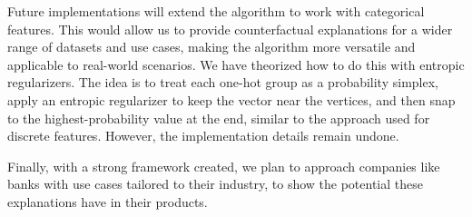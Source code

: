 \documentclass[12pt]{extarticle}
\numberwithin{equation}{section}
\begin{document}
Future implementations will extend the algorithm to work with categorical features. This would allow us to provide counterfactual explanations for a wider range of datasets and use cases, making the algorithm more versatile and applicable to real-world scenarios. We have theorized how to do this with entropic regularizers. The idea is to treat each one-hot group as a probability simplex, apply an entropic regularizer to keep the vector near the vertices, and then snap to the highest-probability value at the end, similar to the approach used for discrete features. However, the implementation details remain undone.

Finally, with a strong framework created, we plan to approach companies like banks with use cases tailored to their industry, to show the potential these explanations have in their products.
\end{document}
